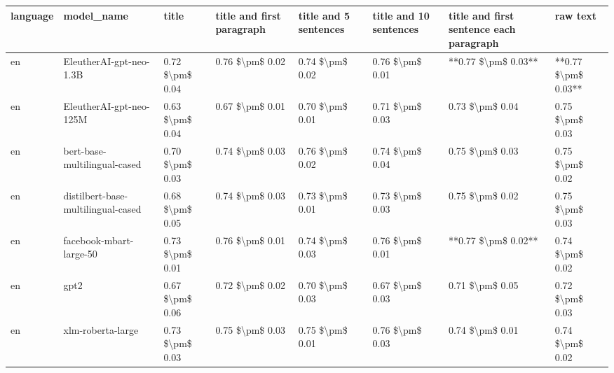 \begin{tabular}{llllllll}
\toprule
language &                         model\_name &           title & title and first paragraph & title and 5 sentences & title and 10 sentences & title and first sentence each paragraph &            raw text \\
\midrule
      en &            EleutherAI-gpt-neo-1.3B & 0.72 \$\textbackslash pm\$ 0.04 &           0.76 \$\textbackslash pm\$ 0.02 &       0.74 \$\textbackslash pm\$ 0.02 &        0.76 \$\textbackslash pm\$ 0.01 &                     **0.77 \$\textbackslash pm\$ 0.03** & **0.77 \$\textbackslash pm\$ 0.03** \\
      en &            EleutherAI-gpt-neo-125M & 0.63 \$\textbackslash pm\$ 0.04 &           0.67 \$\textbackslash pm\$ 0.01 &       0.70 \$\textbackslash pm\$ 0.01 &        0.71 \$\textbackslash pm\$ 0.03 &                         0.73 \$\textbackslash pm\$ 0.04 &     0.75 \$\textbackslash pm\$ 0.03 \\
      en &       bert-base-multilingual-cased & 0.70 \$\textbackslash pm\$ 0.03 &           0.74 \$\textbackslash pm\$ 0.03 &       0.76 \$\textbackslash pm\$ 0.02 &        0.74 \$\textbackslash pm\$ 0.04 &                         0.75 \$\textbackslash pm\$ 0.03 &     0.75 \$\textbackslash pm\$ 0.02 \\
      en & distilbert-base-multilingual-cased & 0.68 \$\textbackslash pm\$ 0.05 &           0.74 \$\textbackslash pm\$ 0.03 &       0.73 \$\textbackslash pm\$ 0.01 &        0.73 \$\textbackslash pm\$ 0.03 &                         0.75 \$\textbackslash pm\$ 0.02 &     0.75 \$\textbackslash pm\$ 0.03 \\
      en &            facebook-mbart-large-50 & 0.73 \$\textbackslash pm\$ 0.01 &           0.76 \$\textbackslash pm\$ 0.01 &       0.74 \$\textbackslash pm\$ 0.03 &        0.76 \$\textbackslash pm\$ 0.01 &                     **0.77 \$\textbackslash pm\$ 0.02** &     0.74 \$\textbackslash pm\$ 0.02 \\
      en &                               gpt2 & 0.67 \$\textbackslash pm\$ 0.06 &           0.72 \$\textbackslash pm\$ 0.02 &       0.70 \$\textbackslash pm\$ 0.03 &        0.67 \$\textbackslash pm\$ 0.03 &                         0.71 \$\textbackslash pm\$ 0.05 &     0.72 \$\textbackslash pm\$ 0.03 \\
      en &                  xlm-roberta-large & 0.73 \$\textbackslash pm\$ 0.03 &           0.75 \$\textbackslash pm\$ 0.03 &       0.75 \$\textbackslash pm\$ 0.01 &        0.76 \$\textbackslash pm\$ 0.03 &                         0.74 \$\textbackslash pm\$ 0.01 &     0.74 \$\textbackslash pm\$ 0.02 \\

\end{tabular}
